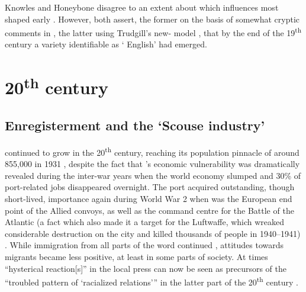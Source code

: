 Knowles and Honeybone disagree to an extent about which influences most shaped early .
However, both assert, the former on the basis of somewhat cryptic comments in \citealt{ellis1889} \citep[cf.][18]{knowles1973}, the latter using Trudgill's new- model \citep[cf.][118]{honeybone2007}, that by the end of the 19\textsuperscript{th} century a variety identifiable as ` English' had emerged.

	\section{20\textsuperscript{th} century}\label{sec.hist.20}

		\subsection{Enregisterment and the `Scouse industry'}\label{sec.hist.20.industry}

 continued to grow in the 20\textsuperscript{th} century, reaching its population pinnacle of around 855,000 in 1931 \citep[cf.][171]{pooley2006}, despite the fact that 's economic vulnerability was dramatically revealed during the inter-war years when the world economy slumped and 30\% of port-related jobs disappeared overnight.
The port acquired outstanding, though short-lived, importance again during World War 2 when  was the European end point of the Allied convoys, as well as the command centre for the Battle of the Atlantic (a fact which also made it a  target for the Luftwaffe, which wreaked considerable destruction on the city and killed thousands of people in 1940--1941) \citep[cf.][393 and 405]{murden2006}.
While immigration from all parts of the word continued \citep[cf.][119]{honeybone2007}, attitudes towards migrants became less positive, at least in some parts of  society.
At times ``hysterical reaction[s]'' in the local press can now be seen as precursors of the ``troubled pattern of `racialized relations''' in the latter part of the 20\textsuperscript{th} century \citep[cf.][23]{belchem2006a}.

